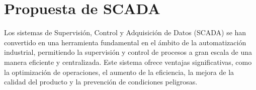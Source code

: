 




\section{Propuesta de SCADA}
\label{sec:scada_proposal}
Los sistemas de Supervisión, Control y Adquisición de Datos (SCADA) se han convertido en
una herramienta fundamental en el ámbito de la automatización industrial, permitiendo
la supervisión y control de procesos a gran escala de una manera eficiente y centralizada.
Este sistema ofrece ventajas significativas, como la optimización de operaciones, el
aumento de la eficiencia, la mejora de la calidad del producto y la prevención de
condiciones peligrosas.

